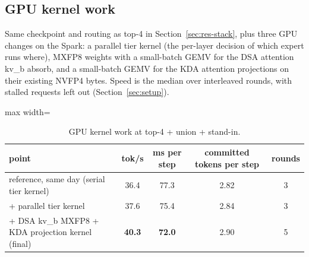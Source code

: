 \documentclass[11pt]{article}
\begin{document}
\FloatBarrier
\subsection{GPU kernel work}
\label{sec:res-kernels}
Same checkpoint and routing as top-4 in Section~\ref{sec:res-stack}, plus three GPU changes on the Spark: a parallel tier
kernel (the per-layer decision of which expert runs where), MXFP8 weights with a small-batch GEMV for the DSA attention
kv\_b absorb, and a small-batch GEMV for the KDA attention projections on their existing NVFP4 bytes. Speed is the median
over interleaved rounds, with stalled requests left out (Section~\ref{sec:setup}).

\begin{table}[h]
\centering\small
\caption{GPU kernel work at top-4 + union + stand-in.}
\label{tab:kernels}
\begin{adjustbox}{max width=\linewidth}
\begin{tabular}{lcccc}
\toprule
point & tok/s & ms per step & committed tokens per step & rounds \\
\midrule
reference, same day (serial tier kernel) & 36.4 & 77.3 & 2.82 & 3 \\
+ parallel tier kernel & 37.6 & 75.4 & 2.84 & 3 \\
+ DSA kv\_b MXFP8 + KDA projection kernel (final) & \textbf{40.3} & \textbf{72.0} & 2.90 & 5 \\
\bottomrule
\end{tabular}
\end{adjustbox}
\end{table}
\end{document}
